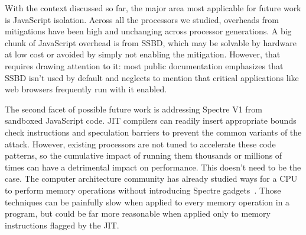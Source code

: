 With the context discussed so far, the major area most applicable for future work is JavaScript isolation.
Across all the processors we studied, overheads from mitigations have been high and unchanging across processor generations.
A big chunk of JavaScript overhead is from SSBD, which may be solvable by hardware at low cost or avoided by simply not enabling the mitigation.
However, that requires drawing attention to it: most public documentation emphasizes that SSBD isn't used by default and neglects to mention that critical applications like web browsers frequently run with it enabled.

The second facet of possible future work is addressing Spectre V1 from sandboxed JavaScript code.
JIT compilers can readily insert appropriate bounds check instructions and speculation barriers to prevent the common variants of the attack.
However, existing processors are not tuned to accelerate these code patterns, so the cumulative impact of running them thousands or millions of times can have a detrimental impact on performance.
This doesn't need to be the case.
The computer architecture community has already studied ways for a CPU to perform memory operations without introducing Spectre gadgets~\cite{ainsworth:muontrap,yu:stt,yu:sdo}.
Those techniques can be painfully slow when applied to every memory operation in a program, but could be far more reasonable when applied only to memory instructions flagged by the JIT.
